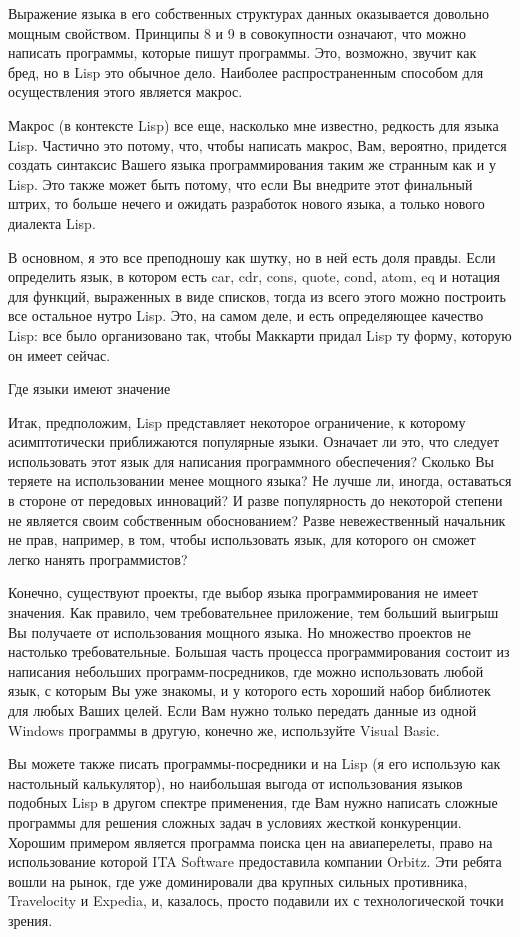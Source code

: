 \documentclass[ebook,12pt,oneside,openany]{memoir}
\begin{document}
Выражение языка в его собственных структурах данных оказывается
довольно мощным свойством. Принципы 8 и 9 в совокупности означают, что
можно написать программы, которые пишут программы. Это, возможно,
звучит как бред, но в Lisp это обычное дело. Наиболее распространенным
способом для осуществления этого является макрос.

Макрос (в контексте Lisp) все еще, насколько мне известно, редкость
для языка Lisp. Частично это потому, что, чтобы написать макрос, Вам,
вероятно, придется создать синтаксис Вашего языка программирования
таким же странным как и у Lisp. Это также может быть потому, что если
Вы внедрите этот финальный штрих, то больше нечего и ожидать
разработок нового языка, а только нового диалекта Lisp.

В основном, я это все преподношу как шутку, но в ней есть доля правды.
Если определить язык, в котором есть car, cdr, cons, quote, cond,
atom, eq и нотация для функций, выраженных в виде списков, тогда из
всего этого можно построить все остальное нутро Lisp. Это, на самом
деле, и есть определяющее качество Lisp: все было организовано так,
чтобы Маккарти придал Lisp ту форму, которую он имеет сейчас.

Где языки имеют значение

Итак, предположим, Lisp представляет некоторое ограничение, к которому
асимптотически приближаются популярные языки. Означает ли это, что
следует использовать этот язык для написания программного обеспечения?
Сколько Вы теряете на использовании менее мощного языка? Не лучше ли,
иногда, оставаться в стороне от передовых инноваций? И разве
популярность до некоторой степени не является своим собственным
обоснованием? Разве невежественный начальник не прав, например, в том,
чтобы использовать язык, для которого он сможет легко нанять
программистов?

Конечно, существуют проекты, где выбор языка программирования не имеет
значения. Как правило, чем требовательнее приложение, тем больший
выигрыш Вы получаете от использования мощного языка. Но множество
проектов не настолько требовательные. Большая часть процесса
программирования состоит из написания небольших программ-посредников,
где можно использовать любой язык, с которым Вы уже знакомы, и у
которого есть хороший набор библиотек для любых Ваших целей. Если Вам
нужно только передать данные из одной Windows программы в другую,
конечно же, используйте Visual Basic.

Вы можете также писать программы-посредники и на Lisp (я его использую
как настольный калькулятор), но наибольшая выгода от использования
языков подобных Lisp в другом спектре применения, где Вам нужно
написать сложные программы для решения сложных задач в условиях
жесткой конкуренции. Хорошим примером является программа поиска цен на
авиаперелеты, право на использование которой ITA Software предоставила
компании Orbitz. Эти ребята вошли на рынок, где уже доминировали два
крупных сильных противника, Travelocity и Expedia, и, казалось, просто
подавили их с технологической точки зрения.
\end{document}
